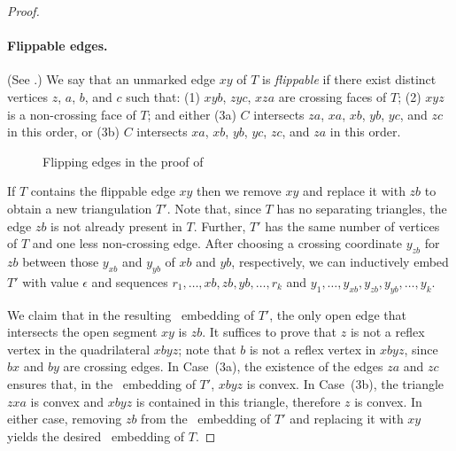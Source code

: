 \begin{proof}
	
	\paragraph{Flippable edges.}
	(See .)
	We say that an unmarked edge $xy$ of $T$ is \emph{flippable} if there
	exist distinct vertices $z$, $a$, $b$, and $c$ such that: (1) $xyb$, $zyc$, $xza$ are crossing faces of $T$; (2) $xyz$ is a non-crossing face of $T$; and either (3a) $C$ intersects $za$, $xa$, $xb$, $yb$, $yc$, and $zc$ in this order, or (3b) $C$ intersects $xa$, $xb$, $yb$, $yc$, $zc$, and $za$ in this order.  
	\begin{figure}
		\caption{Flipping edges in the proof of
			}
	\end{figure}
	
	If $T$ contains the flippable edge $xy$ then we remove $xy$ and replace it with $zb$ to obtain a new triangulation $T'$. Note that, since $T$ has no separating triangles, the edge $zb$ is not already present in $T$. Further, $T'$ has the same number of vertices of $T$ and one less non-crossing edge. After choosing a crossing coordinate $y_{zb}$ for $zb$ between those $y_{xb}$ and $y_{yb}$ of $xb$ and $yb$, respectively, we can inductively embed $T'$ with value $\epsilon$ and sequences $r_1,\dots,xb,zb,yb,\dots,r_k$ and $y_1,\dots,y_{xb},y_{zb},y_{yb},\dots,y_k$.
	
	We claim that in the resulting \Fary\ embedding of $T'$, the only open edge
	that intersects the open segment $xy$ is $zb$. It suffices to prove that $z$ is not a reflex vertex in the quadrilateral $xbyz$; note that $b$ is not a reflex vertex in $xbyz$, since $bx$ and $by$ are crossing edges. In Case~(3a), the existence of the
	edges $za$ and $zc$ ensures that, in the \Fary\ embedding of $T'$,
	$xbyz$ is convex. In Case~(3b), the triangle $zxa$ is convex and $xbyz$ is contained in this triangle, therefore $z$ is convex. In either case, removing $zb$ from the \Fary\ embedding of $T'$ and replacing it with $xy$ yields the desired \Fary\ embedding of $T$.
	

\end{proof}
